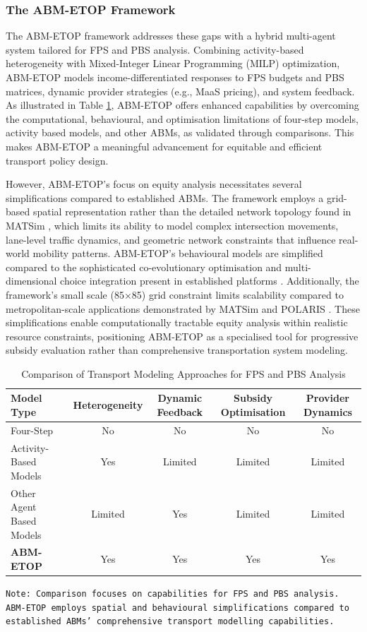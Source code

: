 \documentclass[a4paper,fleqn]{cas-sc}
\begin{document}
\subsubsection{The ABM-ETOP Framework}
The ABM-ETOP framework addresses these gaps with a hybrid multi-agent system tailored for FPS and PBS analysis. Combining activity-based heterogeneity with Mixed-Integer Linear Programming (MILP) optimization, ABM-ETOP models income-differentiated responses to FPS budgets and PBS matrices, dynamic provider strategies (e.g., MaaS pricing), and system feedback. As illustrated in Table \ref{tab:model_comparison}, ABM-ETOP offers enhanced capabilities by overcoming the computational, behavioural, and optimisation limitations of four-step models, activity based models, and other ABMs, as validated through comparisons. This makes ABM-ETOP a meaningful advancement for equitable and efficient transport policy design. 

However, ABM-ETOP's focus on equity analysis necessitates several simplifications compared to established ABMs. The framework employs a grid-based spatial representation rather than the detailed network topology found in MATSim \citep{Horni2016}, which limits its ability to model complex intersection movements, lane-level traffic dynamics, and geometric network constraints that influence real-world mobility patterns. ABM-ETOP's behavioural models are simplified compared to the sophisticated co-evolutionary optimisation and multi-dimensional choice integration present in established platforms \citep{Axhausen2010}. Additionally, the framework's small scale (85×85) grid constraint limits scalability compared to metropolitan-scale applications demonstrated by MATSim and POLARIS \citep{Auld2016}. These simplifications enable computationally tractable equity analysis within realistic resource constraints, positioning ABM-ETOP as a specialised tool for progressive subsidy evaluation rather than comprehensive transportation system modeling.

\begin{table}[!t]
\caption{Comparison of Transport Modeling Approaches for FPS and PBS Analysis}
\label{tab:model_comparison}
\centering
\begin{tabular}{lcccc}
\toprule
\textbf{Model Type} & \textbf{Heterogeneity}& \textbf{Dynamic Feedback} & \textbf{Subsidy Optimisation}& \textbf{Provider Dynamics} \\
\midrule
Four-Step & No & No & No & No \\
Activity-Based Models & Yes& Limited & Limited& Limited \\
Other Agent Based Models& Limited& Yes & Limited & Limited \\
\textbf{ABM-ETOP} & Yes & Yes & Yes& Yes \\
\bottomrule
\end{tabular}
\footnotesize
\texttt{Note: Comparison focuses on capabilities for FPS and PBS analysis. ABM-ETOP employs spatial and behavioural simplifications compared to established ABMs' comprehensive transport modelling capabilities.}
\end{table}
\end{document}
